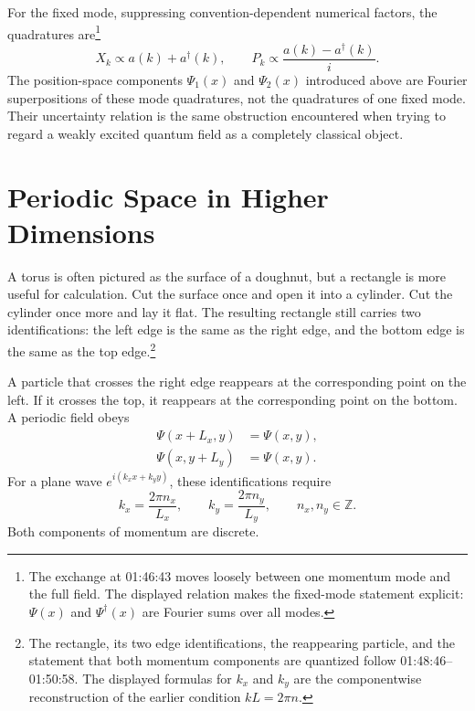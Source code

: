 For the fixed mode, suppressing convention-dependent numerical factors, the quadratures are\footnote{The exchange at 01:46:43 moves loosely between one momentum mode and the full field. The displayed relation makes the fixed-mode statement explicit: \(\Psi(x)\) and \(\Psi^\dagger(x)\) are Fourier sums over all modes.}
\begin{equation}
X_k\propto a(k)+a^\dagger(k),
\qquad
P_k\propto \frac{a(k)-a^\dagger(k)}{i}.
\end{equation}
The position-space components \(\Psi_1(x)\) and \(\Psi_2(x)\) introduced above are Fourier superpositions of these mode quadratures, not the quadratures of one fixed mode. Their uncertainty relation is the same obstruction encountered when trying to regard a weakly excited quantum field as a completely classical object.

\section{Periodic Space in Higher Dimensions}

\begin{classroomqa}
\end{classroomqa}

A torus is often pictured as the surface of a doughnut, but a rectangle is more useful for calculation. Cut the surface once and open it into a cylinder. Cut the cylinder once more and lay it flat. The resulting rectangle still carries two identifications: the left edge is the same as the right edge, and the bottom edge is the same as the top edge.\footnote{The rectangle, its two edge identifications, the reappearing particle, and the statement that both momentum components are quantized follow 01:48:46--01:50:58. The displayed formulas for \(k_x\) and \(k_y\) are the componentwise reconstruction of the earlier condition \(kL=2\pi n\).}

A particle that crosses the right edge reappears at the corresponding point on the left. If it crosses the top, it reappears at the corresponding point on the bottom. A periodic field obeys
\begin{align}
\Psi(x+L_x,y)&=\Psi(x,y),\\
\Psi(x,y+L_y)&=\Psi(x,y).
\end{align}
For a plane wave \(e^{i(k_x x+k_y y)}\), these identifications require
\begin{equation}
k_x=\frac{2\pi n_x}{L_x},
\qquad
k_y=\frac{2\pi n_y}{L_y},
\qquad
n_x,n_y\in\mathbb Z.
\end{equation}
Both components of momentum are discrete.

